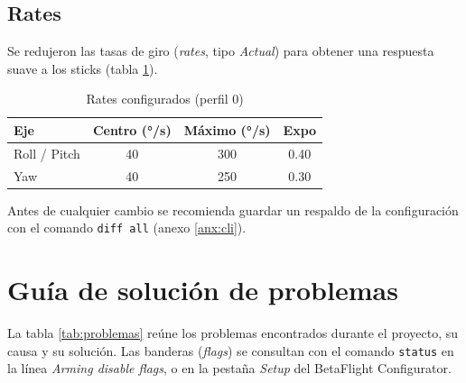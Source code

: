 \documentclass[11pt,letterpaper]{article}
\begin{document}
\subsection{Rates}
Se redujeron las tasas de giro (\textit{rates}, tipo \textit{Actual}) para obtener una respuesta suave a los sticks (tabla \ref{tab:rates}).

\begin{table}[!h]
\centering
\caption{Rates configurados (perfil 0)}
\label{tab:rates}
\begin{tabular}{@{}lccc@{}}
\toprule
\textbf{Eje} & \textbf{Centro (°/s)} & \textbf{Máximo (°/s)} & \textbf{Expo} \\
\midrule
Roll / Pitch & 40 & 300 & 0.40 \\
Yaw          & 40 & 250 & 0.30 \\
\bottomrule
\end{tabular}
\end{table}

Antes de cualquier cambio se recomienda guardar un respaldo de la configuración con el comando \texttt{diff all} (anexo \ref{anx:cli}).

\section{Guía de solución de problemas}
\label{sec:problemas}
La tabla \ref{tab:problemas} reúne los problemas encontrados durante el proyecto, su causa y su solución. Las banderas (\textit{flags}) se consultan con el comando \texttt{status} en la línea \textit{Arming disable flags}, o en la pestaña \textit{Setup} del BetaFlight Configurator.
\end{document}
